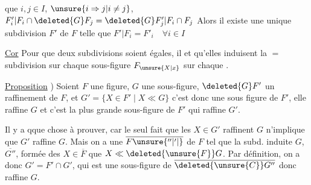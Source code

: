 
que  $i,j\in I$, $\unsure{i\Rightarrow j|i\ne j}$, $F'_i|F_i\cap\deleted{G}F_j=\deleted{G}F'_j|F_i\cap F_j$ Alors il existe une unique subdivision $F'$ de $F$ telle que $F'|F_i=F'_i\quad\forall i\in I$

\uline{Cor} Pour que deux subdivisions  soient égales, il  et  qu'elles induisent la $=$ subdivision sur chaque sous-figure  $F_{\unsure{X|x}}$  sur chaque .

 \uline{Proposition} ) Soient $F$ une figure, $G$ une sous-figure, $\deleted{G}F'$ un raffinement de $F$, et $G'=\{X\in F'\mid X\ll G\}$ c'est donc une sous figure de $F'$,  elle raffine $G$ et c'est  la plus grande sous-figure de $F'$ qui raffine $G'$.



 Il y a qque chose à prouver, car le seul fait que les $X\in G'$ raffinent $G$ n'implique  que $G'$ raffine $G$. Mais on a une   $\overline{F\unsure{''|'|{}}}$ de $F$ tel que   la subd. induite  $G$, $\overline{G''}$, formée des $X\in\overline{F}$  que $X\ll \deleted{\unsure{F}}G$.  Par définition, on a donc $G'=F'\cap G'$, qui est  une sous-figure de $\overline{\deleted{\unsure{C}}G''}$ donc raffine $G$.
